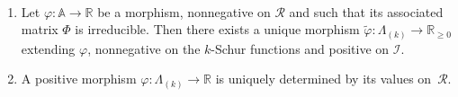 \documentclass[ALCO,ThmDefs,Unicode,epreuves]{cedram}
\begin{document}
\begin{theorem}
\label{principalDomain} \ 

\begin{enumerate}
\item\label{theo5.1_1} Let $\varphi:\mathbb{A}\rightarrow\mathbb{R}$ be a morphism, nonnegative
on $\mathcal{R}$ and such that its associated matrix $\Phi$ is irreducible.
Then there exists a unique morphism $\tilde{\varphi}:\Lambda_{(k)}%
\longrightarrow\mathbb{R}_{\geq0}$ extending $\varphi$, nonnegative on the
$k$-Schur functions and positive on $\mathcal{I}$.

\item\label{theo5.1_2} A positive morphism $\varphi:\Lambda_{(k)}\longrightarrow\mathbb{R}$ is
uniquely determined by its values on~$\mathcal{R}$.
\end{enumerate}
\end{theorem}
\end{document}
